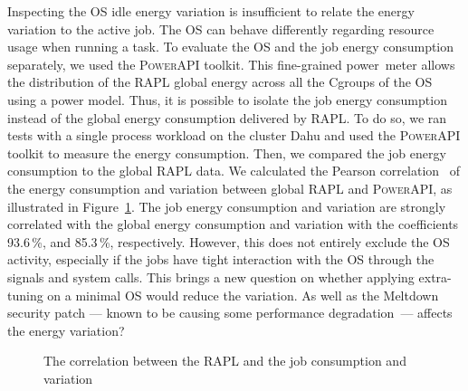 Inspecting the OS idle energy variation is insufficient to relate the energy variation to the active job.
The OS can behave differently regarding resource usage when running a task.
To evaluate the OS and the job energy consumption separately, we used the \textsc{PowerAPI} toolkit.
This fine-grained power~meter allows the distribution of the RAPL global energy across all the Cgroups of the OS using a power model.
Thus, it is possible to isolate the job energy consumption instead of the global energy consumption delivered by RAPL.
To do so, we ran tests with a single process workload on the cluster \textsf{Dahu} and used the \textsc{PowerAPI} toolkit to measure the energy consumption.
Then, we compared the job energy consumption to the global RAPL data.
We calculated the Pearson correlation~\cite{ref1} of the energy consumption and variation between global RAPL and \textsc{PowerAPI}, as illustrated in Figure~\ref{fig:ev_correlation}.
The job energy consumption and variation are strongly correlated with the global energy consumption and variation with the coefficients 93.6\,\%, and 85.3\,\%, respectively.
However, this does not entirely exclude the OS activity, especially if the jobs have tight interaction with the OS through the signals and system calls.
This brings a new question on whether applying extra-tuning on a minimal OS would reduce the variation.
As well as the Meltdown security patch --- known to be causing some performance degradation~\cite{Kocher2018spectre,Lipp2018meltdown}--- affects the energy variation?

\begin{figure}
    \caption{The correlation between the RAPL and the job consumption and variation}\label{fig:ev_correlation}
\end{figure}

